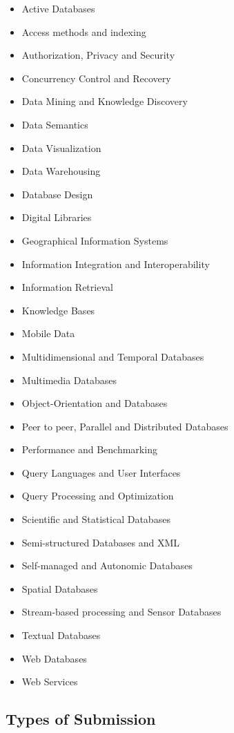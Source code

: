 \documentclass[jidm,a4paper]{jidm} %
\begin{document}
\begin{itemize}
	\item Active Databases 
	\item Access methods and indexing 
	\item Authorization, Privacy and Security 
	\item Concurrency Control and Recovery 
	\item Data Mining and Knowledge Discovery 
	\item Data Semantics 
	\item Data Visualization 
	\item Data Warehousing 
	\item Database Design 
	\item Digital Libraries 
	\item Geographical Information Systems 
	\item Information Integration and Interoperability 
	\item Information Retrieval 
	\item Knowledge Bases 
	\item Mobile Data 
	\item Multidimensional and Temporal Databases 
	\item Multimedia Databases 
	\item Object-Orientation and Databases 
	\item Peer to peer, Parallel and Distributed Databases 
	\item Performance and Benchmarking 
	\item Query Languages and User Interfaces 
	\item Query Processing and Optimization 
	\item Scientific and Statistical Databases 
	\item Semi-structured Databases and XML 
	\item Self-managed and Autonomic Databases 
	\item Spatial Databases 
	\item Stream-based processing and Sensor Databases 
	\item Textual Databases 
	\item Web Databases 
	\item Web Services 
\end{itemize}

\subsection{Types of Submission}
\end{document}
